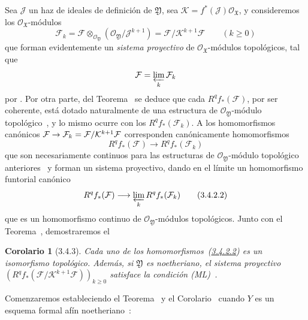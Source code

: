 \documentclass[10pt,oneside,openany]{book}
\theoremstyle{egaenv}\newtheorem*{env}{---}
\theoremstyle{egastatement}
\newtheorem*{corollary}{Corolario}
\theoremstyle{egadescription}
\newcommand{\oldpage}[2][]{\marginnote{\normalfont\scriptsize\textbf{#1}\,|\,#2}\ignorespaces}
\renewcommand{\geq}{\geqslant}
\renewcommand{\to}{\mathchoice{\longrightarrow}{\rightarrow}{\rightarrow}{\rightarrow}}
\begin{document}
Sea $\mathcal J$ un haz de ideales de definición de $\mathfrak Y$, sea $\mathcal K=f^*(\mathcal J)\mathcal O_{\mathfrak X}$, y consideremos los $\mathcal O_{\mathfrak X}$-módulos
\[
\mathcal F_k=\mathcal F\otimes_{\mathcal O_{\mathfrak Y}}
(\mathcal O_{\mathfrak Y}/\mathcal J^{k+1})
=\mathcal F/\mathcal K^{k+1}\mathcal F\qquad(k\geq0)
\tag{3.4.2.1}\label{III.3.4.2.1-fr}
\]
que forman evidentemente un \emph{sistema proyectivo} de $\mathcal O_{\mathfrak X}$-módulos topológicos, tal que
\oldpage[III]{120}
\[
\mathcal F=\varprojlim_k\mathcal F_k
\]
por .
Por otra parte, del Teorema~ se deduce que cada $R^qf_*(\mathcal F)$, por ser coherente, está dotado naturalmente de una estructura de $\mathcal O_{\mathfrak Y}$-módulo topológico~, y lo mismo ocurre con los $R^qf_*(\mathcal F_k)$.
A los homomorfismos canónicos $\mathcal F\to\mathcal F_k=\mathcal F/\mathcal K^{k+1}\mathcal F$ corresponden canónicamente homomorfismos
\[
R^qf_*(\mathcal F)\longrightarrow R^qf_*(\mathcal F_k)
\]
que son necesariamente continuos para las estructuras de $\mathcal O_{\mathfrak Y}$-módulo topológico anteriores~ y forman un sistema proyectivo, dando en el límite un homomorfismo funtorial canónico
\[
R^qf_*(\mathcal F)\longrightarrow\varprojlim_kR^qf_*(\mathcal F_k)
\tag{3.4.2.2}\label{III.3.4.2.2-fr}
\]
que es un homomorfismo continuo de $\mathcal O_{\mathfrak Y}$-módulos topológicos.
Junto con el Teorema~, demostraremos el
\begin{corollary}[3.4.3]
\label{III.3.4.3}
\label{III.3.4.3-fr}
Cada uno de los homomorfismos~(\hyperref[III.3.4.2.2]{3.4.2.2}) es un isomorfismo topológico.
Además, si $\mathfrak Y$ es noetheriano, el sistema proyectivo $(R^qf_*(\mathcal F/\mathcal K^{k+1}\mathcal F))_{k\geq0}$ satisface la condición \emph{(ML)}~.
\end{corollary}
Comenzaremos estableciendo el Teorema~ y el Corolario~ cuando $Y$ es un esquema formal afín noetheriano~:
\end{document}
